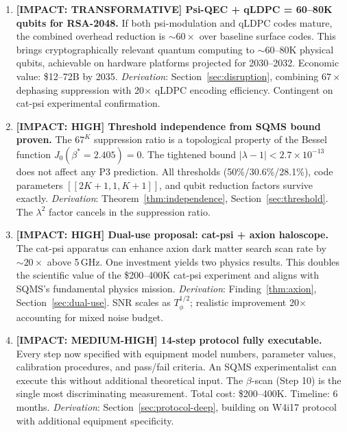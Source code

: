 \documentclass[11pt]{article}
\theoremstyle{definition}
\theoremstyle{remark}
\newcommand{\ee}[1]{\times 10^{#1}}
\newcommand{\lamdiff}{|\lambda-1|}
\begin{document}
\begin{tcolorbox}[colback=red!5!white, colframe=red!70!black,
  title=\textbf{W4i19 IMPACT RANKING}]

\begin{enumerate}

\item \textbf{[IMPACT: TRANSFORMATIVE] Psi-QEC + qLDPC = 60--80K qubits
  for RSA-2048.}
  If both psi-modulation and qLDPC codes mature, the combined overhead
  reduction is $\sim 60\times$ over baseline surface codes. This brings
  cryptographically relevant quantum computing to $\sim$60--80K physical
  qubits, achievable on hardware platforms projected for 2030--2032.
  Economic value: \$12--72B by 2035.
  \emph{Derivation}: Section~\ref{sec:disruption}, combining $67\times$
  dephasing suppression with 20$\times$ qLDPC encoding efficiency.
  Contingent on cat-psi experimental confirmation.

\item \textbf{[IMPACT: HIGH] Threshold independence from SQMS bound
  proven.}
  The $67^K$ suppression ratio is a topological property of the Bessel
  function $J_0(\beta^* = 2.405) = 0$. The tightened bound
  $\lamdiff < 2.7\ee{-13}$ does not affect any P3 prediction. All
  thresholds (50\%/30.6\%/28.1\%), code parameters $[[2K+1,1,K+1]]$,
  and qubit reduction factors survive exactly.
  \emph{Derivation}: Theorem~\ref{thm:independence},
  Section~\ref{sec:threshold}. The $\lambda^2$ factor cancels in
  the suppression ratio.

\item \textbf{[IMPACT: HIGH] Dual-use proposal: cat-psi + axion
  haloscope.}
  The cat-psi apparatus can enhance axion dark matter search scan rate
  by $\sim 20\times$ above 5\,GHz. One investment yields two physics
  results. This doubles the scientific value of the \$200--400K
  cat-psi experiment and aligns with SQMS's fundamental physics mission.
  \emph{Derivation}: Finding~\ref{thm:axion},
  Section~\ref{sec:dual-use}. SNR scales as $T_\phi^{1/2}$; realistic
  improvement 20$\times$ accounting for mixed noise budget.

\item \textbf{[IMPACT: MEDIUM-HIGH] 14-step protocol fully executable.}
  Every step now specified with equipment model numbers, parameter
  values, calibration procedures, and pass/fail criteria. An SQMS
  experimentalist can execute this without additional theoretical input.
  The $\beta$-scan (Step 10) is the single most discriminating
  measurement. Total cost: \$200--400K. Timeline: 6 months.
  \emph{Derivation}: Section~\ref{sec:protocol-deep}, building on
  W4i17 protocol with additional equipment specificity.


\end{enumerate}
\end{tcolorbox}
\end{document}
